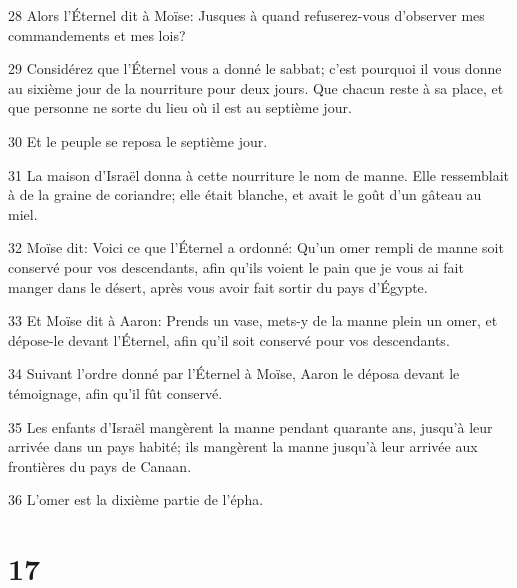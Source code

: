\par 28 Alors l'Éternel dit à Moïse: Jusques à quand refuserez-vous d'observer mes commandements et mes lois?
\par 29 Considérez que l'Éternel vous a donné le sabbat; c'est pourquoi il vous donne au sixième jour de la nourriture pour deux jours. Que chacun reste à sa place, et que personne ne sorte du lieu où il est au septième jour.
\par 30 Et le peuple se reposa le septième jour.
\par 31 La maison d'Israël donna à cette nourriture le nom de manne. Elle ressemblait à de la graine de coriandre; elle était blanche, et avait le goût d'un gâteau au miel.
\par 32 Moïse dit: Voici ce que l'Éternel a ordonné: Qu'un omer rempli de manne soit conservé pour vos descendants, afin qu'ils voient le pain que je vous ai fait manger dans le désert, après vous avoir fait sortir du pays d'Égypte.
\par 33 Et Moïse dit à Aaron: Prends un vase, mets-y de la manne plein un omer, et dépose-le devant l'Éternel, afin qu'il soit conservé pour vos descendants.
\par 34 Suivant l'ordre donné par l'Éternel à Moïse, Aaron le déposa devant le témoignage, afin qu'il fût conservé.
\par 35 Les enfants d'Israël mangèrent la manne pendant quarante ans, jusqu'à leur arrivée dans un pays habité; ils mangèrent la manne jusqu'à leur arrivée aux frontières du pays de Canaan.
\par 36 L'omer est la dixième partie de l'épha.

\chapter{17}

